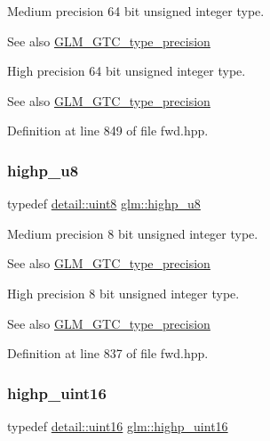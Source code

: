 Medium precision 64 bit unsigned integer type. \begin{DoxySeeAlso}{See also}
\mbox{\hyperlink{group__gtc__type__precision}{G\+L\+M\+\_\+\+G\+T\+C\+\_\+type\+\_\+precision}}
\end{DoxySeeAlso}
High precision 64 bit unsigned integer type. \begin{DoxySeeAlso}{See also}
\mbox{\hyperlink{group__gtc__type__precision}{G\+L\+M\+\_\+\+G\+T\+C\+\_\+type\+\_\+precision}} 
\end{DoxySeeAlso}


Definition at line 849 of file fwd.\+hpp.

\mbox{\label{group__gtc__type__precision_ga8a60abe782749c504fb5ae51eb8b49cc}} 
\subsubsection{\texorpdfstring{highp\_u8}{highp\_u8}}
{\footnotesize\ttfamily typedef \mbox{\hyperlink{namespaceglm_1_1detail_aef2588f97d090cc19fbbe0c74fe17c8f}{detail\+::uint8}} \mbox{\hyperlink{group__gtc__type__precision_ga8a60abe782749c504fb5ae51eb8b49cc}{glm\+::highp\+\_\+u8}}}

Medium precision 8 bit unsigned integer type. \begin{DoxySeeAlso}{See also}
\mbox{\hyperlink{group__gtc__type__precision}{G\+L\+M\+\_\+\+G\+T\+C\+\_\+type\+\_\+precision}}
\end{DoxySeeAlso}
High precision 8 bit unsigned integer type. \begin{DoxySeeAlso}{See also}
\mbox{\hyperlink{group__gtc__type__precision}{G\+L\+M\+\_\+\+G\+T\+C\+\_\+type\+\_\+precision}} 
\end{DoxySeeAlso}


Definition at line 837 of file fwd.\+hpp.

\mbox{\label{group__gtc__type__precision_ga4d32967d45ba8365e2a05eaaac85e978}} 
\subsubsection{\texorpdfstring{highp\_uint16}{highp\_uint16}}
{\footnotesize\ttfamily typedef \mbox{\hyperlink{namespaceglm_1_1detail_a47b2a7d006d187338e8031a352d1ce56}{detail\+::uint16}} \mbox{\hyperlink{group__gtc__type__precision_ga4d32967d45ba8365e2a05eaaac85e978}{glm\+::highp\+\_\+uint16}}}

